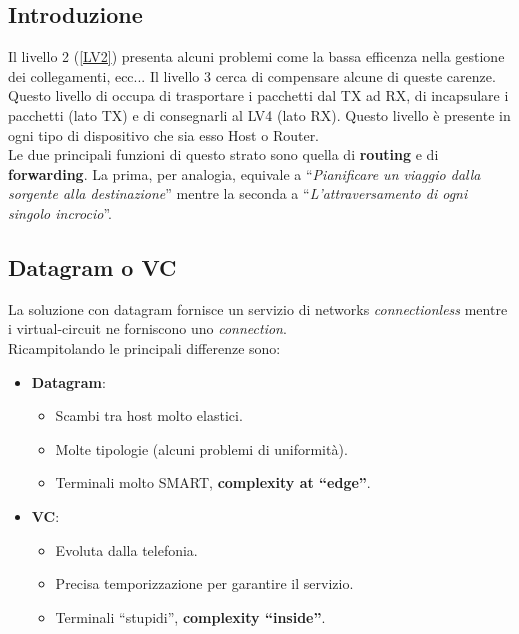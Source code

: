 \documentclass[12pt]{article}
\begin{document}
\subsection{Introduzione}
Il livello 2 (\ref{LV2}) presenta alcuni problemi come la bassa efficenza nella gestione dei collegamenti, ecc... Il livello 3 cerca di compensare alcune di queste carenze.\\
Questo livello di occupa di trasportare i pacchetti dal TX ad RX, di incapsulare i pacchetti (lato TX) e di consegnarli al LV4 (lato RX). Questo livello è presente in ogni tipo di dispositivo che sia esso Host o Router.\\
Le due principali funzioni di questo strato sono quella di \textbf{routing} e di \textbf{forwarding}. La prima, per analogia, equivale a ``\textit{Pianificare un viaggio dalla sorgente alla destinazione}'' mentre la seconda a ``\textit{L'attraversamento di ogni singolo incrocio}''.

\subsection{Datagram o VC}
La soluzione con datagram fornisce un servizio di networks \textit{connectionless} mentre i virtual-circuit ne forniscono uno \textit{connection}.\\
Ricampitolando le principali differenze sono:
\begin{itemize}
  \item \textbf{Datagram}:
  \begin{itemize}
    \item Scambi tra host molto elastici.
    \item Molte tipologie (alcuni problemi di uniformità).
    \item Terminali molto SMART, \textbf{complexity at ``edge''}.
  \end{itemize}
  \item \textbf{VC}:
  \begin{itemize}
    \item Evoluta dalla telefonia.
    \item Precisa temporizzazione per garantire il servizio.
    \item Terminali ``stupidi'', \textbf{complexity ``inside''}.
  \end{itemize}
\end{itemize}
\end{document}
